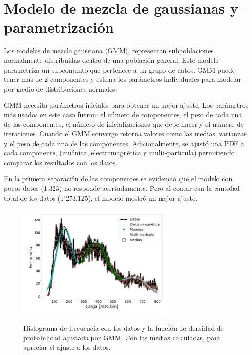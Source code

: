 \section{Modelo de mezcla de gaussianas y parametrización}

Los modelos de mezcla gaussiana (GMM), representan subpoblaciones normalmente distribuidas dentro de una población general. Este modelo parametriza un subconjunto que pertenece a un grupo de datos. GMM puede tener más de 2 componentes y estima los parámetros individuales para modelar por medio de distribuciones normales.

GMM necesita parámetros iniciales para obtener un mejor ajuste. Los parámetros más usados en este caso fueron: el número de componentes, el peso de cada una de las componentes, el número de inicializaciones que debe hacer y el número de iteraciones. Cuando el GMM converge retorna valores como las medias, varianzas y el peso de cada una de las componentes. Adicionalmente, se ajustó una PDF a cada componente, (muónica, electromagnética y multi-partícula) permitiendo comparar los resultados con los datos. 

En la primera separación de las componentes se evidenció que el modelo con pocos datos (1.323) no responde acertadamente. Pero al contar con la cantidad total de los datos (1'273.125), el modelo mostró un mejor ajuste. 

\begin{figure}[h!]
\begin{center}
\caption{Histograma de frecuencia con los datos y la función de densidad de probabilidad ajustada por GMM. Con las medias calculadas, para apreciar el ajuste a los datos.}
\includegraphics[width=0.7\textwidth]{Figures/imagenes/4.png}
\label{cuatro}
\end{center}
\end{figure}

